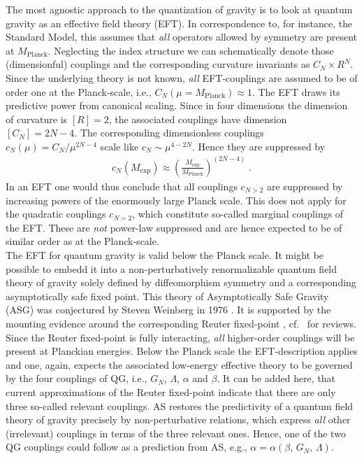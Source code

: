 \documentclass[a4paper,oneside,openany,11pt]{memoir}
\numberwithin{equation}{section} %
\begin{document}
The most agnostic approach to the quantization of gravity is to
look at quantum gravity as an effective field theory (EFT). In
correspondence to, for instance, the Standard Model, this assumes
that \emph{all} operators allowed by symmetry are present at
$M_\text{Planck}$. Neglecting the index structure we can schematically
denote those (dimensionful) couplings and the corresponding curvature
invariants as $C_N\times R^N$. Since the underlying theory is not
known, \emph{all} EFT-couplings are assumed to be of order one at
the Planck-scale, i.e., $C_N(\mu=M_\text{Planck})\approx 1$. The
EFT draws its predictive power from canonical scaling. Since in
four dimensions the dimension of curvature is $[R]=2$, the associated
couplings have dimension $[C_N] = 2N - 4$. The corresponding
dimensionless couplings $c_N(\mu) = C_N / \mu^{2N-4}$ scale like
$c_N \sim \mu^{4-2N}$. Hence they are suppressed by
\begin{align}
    c_N(M_\text{exp}) \approx \left(\frac{M_\text{exp}}{M_\text{Planck}}\right)^{(2N-4)}\;.
\end{align}
    In an EFT one would thus conclude that all couplings $c_{N>2}$
    are suppressed by increasing powers of the enormously large
    Planck scale. This does not apply for the quadratic couplings
    $c_{N=2}$, which constitute so-called marginal couplings of the
    EFT. These are \emph{not} power-law suppressed and are hence
    expected to be of similar order as at the Planck-scale.
\\
    
The EFT for quantum gravity is valid below the Planck scale. It
might be possible to embedd it into a non-perturbatively renormalizable
quantum field theory of gravity solely defined by diffeomorphism
symmetry and a corresponding asymptotically safe fixed point. This
theory of Asymptotically Safe Gravity (ASG) was conjectured by
Steven Weinberg in 1976 \cite{Weinberg:1980gg}.  It is supported
by the mounting evidence around the corresponding Reuter fixed-point
\cite{Reuter:1996cp}, cf.~\cite{} for reviews. Since the Reuter
fixed-point is fully interacting, \emph{all} higher-order couplings
will be present at Planckian energies. Below the Planck scale the
EFT-description applies and one, again, expects the associated
low-energy effective theory to be governed by the four couplings
of QG, i.e., $G_N$, $\Lambda$, $\alpha$ and $\beta$. It can be added
here, that current approximations of the Reuter fixed-point indicate
that there are only three so-called relevant couplings. AS restores
the predictivity of a quantum field theory of gravity precisely by
non-perturbative relations, which express \emph{all} other (irrelevant)
couplings in terms of the three relevant ones. Hence, one of the
two QG couplings could follow as a prediction from AS, e.g., $\alpha
= \alpha (\beta,\,G_N,\,\Lambda)$.
\end{document}
